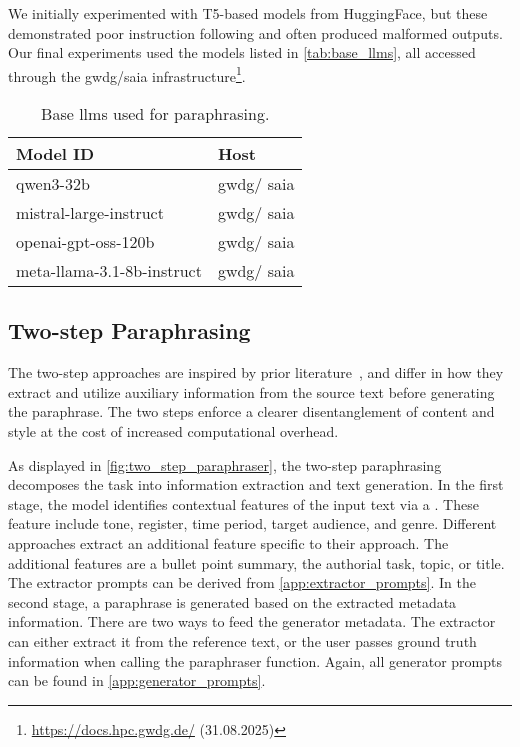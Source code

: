 We initially experimented with T5-based models from HuggingFace, but these demonstrated poor instruction following and often produced malformed outputs. 
Our final experiments used the models listed in \autoref{tab:base_llms}, all accessed through the \ac{gwdg}/\ac{saia} infrastructure\footnote{\url{https://docs.hpc.gwdg.de/} (31.08.2025)}.

\begin{table}[h]
\centering
\caption{Base \acp{llm} used for paraphrasing.}
\label{tab:base_llms}
\begin{tabular}{ll}
\toprule
\textbf{Model ID}                    & \textbf{Host} \\
\midrule
qwen3-32b                            & \ac{gwdg}/ \ac{saia}    \\
mistral-large-instruct               & \ac{gwdg}/ \ac{saia}    \\
openai-gpt-oss-120b                  & \ac{gwdg}/ \ac{saia}    \\
meta-llama-3.1-8b-instruct           & \ac{gwdg}/ \ac{saia}    \\
\bottomrule   
\end{tabular}%
\end{table}


\subsection{Two-step Paraphrasing}

The two-step approaches are inspired by prior literature~\citep{bevendorff_overview_2024, ayele_overview_2024}, and differ in how they extract and utilize auxiliary information from the source text before generating the paraphrase. 
The two steps enforce a clearer disentanglement of content and style at the cost of increased computational overhead.

As displayed in \autoref{fig:two_step_paraphraser}, the two-step paraphrasing decomposes the task into information extraction and text generation. 
In the first stage, the model identifies contextual features of the input text via a \pextractor{}.
These feature include tone, register, time period, target audience, and genre.
Different approaches extract an additional feature specific to their approach.
The additional features are a bullet point summary, the authorial task, topic, or title. 
The extractor prompts can be derived from \autoref{app:extractor_prompts}.
In the second stage, a paraphrase is generated based on the extracted metadata information. 
There are two ways to feed the generator metadata.
The extractor can either extract it from the reference text, or the user passes ground truth information when calling the paraphraser function.
Again, all generator prompts can be found in \autoref{app:generator_prompts}.

